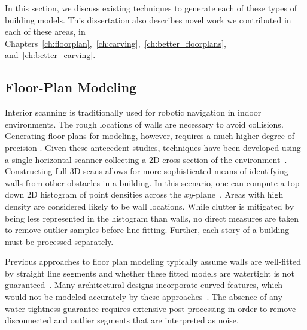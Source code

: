\documentclass[12pt,onecolumn,oneside]{book}
\begin{document}
In this section, we discuss existing techniques to generate each of these types of building models.  This dissertation also describes novel work we contributed in each of these areas, in Chapters~\ref{ch:floorplan},~\ref{ch:carving},~\ref{ch:better_floorplans}, and~\ref{ch:better_carving}.

\subsection{Floor-Plan Modeling}
\label{ssec:background_floorplan}

Interior scanning is traditionally used for robotic navigation in indoor environments.  The rough locations of walls are necessary to avoid collisions.  Generating floor plans for modeling, however, requires a much higher degree of precision \cite{Okorn09}.  Given these antecedent studies, techniques have been developed using a single horizontal scanner collecting a 2D cross-section of the environment~\cite{Weiss05}.  Constructing full 3D scans allows for more sophisticated means of identifying walls from other obstacles in a building.  In this scenario, one can compute a top-down 2D histogram of point densities across the $xy$-plane~\cite{Okorn09}.  Areas with high density are considered likely to be wall locations.  While clutter is mitigated by being less represented in the histogram than walls, no direct measures are taken to remove outlier samples before line-fitting.  Further, each story of a building must be processed separately.

Previous approaches to floor plan modeling typically assume walls are well-fitted by straight line segments and whether these fitted models are watertight is not guaranteed~\cite{Nuchter03, Okorn09, Weiss05}.  Many architectural designs incorporate curved features, which would not be modeled accurately by these approaches~\cite{Castles07,Turner12}. The absence of any water-tightness guarantee requires extensive post-processing in order to remove disconnected and outlier segments that are interpreted as noise.
\end{document}
